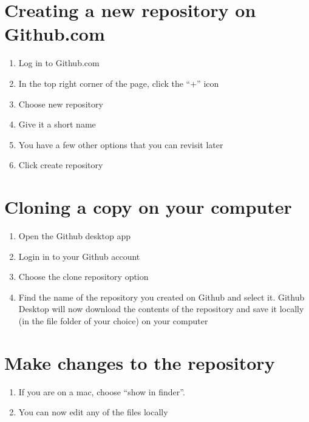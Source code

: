 \documentclass[]{book}
\providecommand{\tightlist}{%
  \setlength{\itemsep}{0pt}\setlength{\parskip}{0pt}}
\theoremstyle{definition}
\theoremstyle{definition}
\theoremstyle{definition}
\theoremstyle{remark}
\begin{document}
\section{Creating a new repository on
Github.com}\label{creating-a-new-repository-on-github.com}

\begin{enumerate}
\def\labelenumi{\arabic{enumi}.}
\tightlist
\item
  Log in to Github.com
\item
  In the top right corner of the page, click the ``+'' icon
\item
  Choose new repository
\item
  Give it a short name
\item
  You have a few other options that you can revisit later
\item
  Click create repository
\end{enumerate}

\section{Cloning a copy on your
computer}\label{cloning-a-copy-on-your-computer}

\begin{enumerate}
\def\labelenumi{\arabic{enumi}.}
\tightlist
\item
  Open the Github desktop app
\item
  Login in to your Github account
\item
  Choose the clone repository option
\item
  Find the name of the repository you created on Github and select it.
  Github Desktop will now download the contents of the repository and
  save it locally (in the file folder of your choice) on your computer
\end{enumerate}

\section{Make changes to the
repository}\label{make-changes-to-the-repository}

\begin{enumerate}
\def\labelenumi{\arabic{enumi}.}
\tightlist
\item
  If you are on a mac, choose ``show in finder''.
\item
  You can now edit any of the files locally
\end{enumerate}
\end{document}

